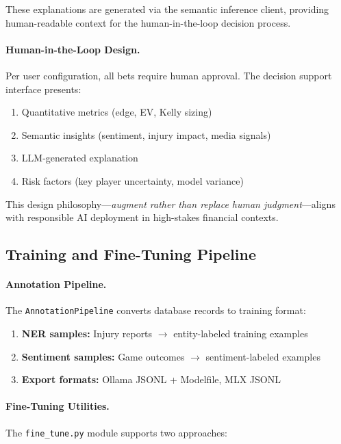 These explanations are generated via the semantic inference client, providing human-readable context for the human-in-the-loop decision process.

\paragraph{Human-in-the-Loop Design.}
Per user configuration, all bets require human approval. The decision support interface presents:

\begin{enumerate}[itemsep=2pt,parsep=0pt]
    \item Quantitative metrics (edge, EV, Kelly sizing)
    \item Semantic insights (sentiment, injury impact, media signals)
    \item LLM-generated explanation
    \item Risk factors (key player uncertainty, model variance)
\end{enumerate}

This design philosophy---\textit{augment rather than replace human judgment}---aligns with responsible AI deployment in high-stakes financial contexts.

\subsection{Training and Fine-Tuning Pipeline}

\paragraph{Annotation Pipeline.}
The \texttt{AnnotationPipeline} converts database records to training format:

\begin{enumerate}[itemsep=2pt,parsep=0pt]
    \item \textbf{NER samples:} Injury reports $\to$ entity-labeled training examples
    \item \textbf{Sentiment samples:} Game outcomes $\to$ sentiment-labeled examples
    \item \textbf{Export formats:} Ollama JSONL + Modelfile, MLX JSONL
\end{enumerate}

\paragraph{Fine-Tuning Utilities.}
The \texttt{fine\_tune.py} module supports two approaches:

